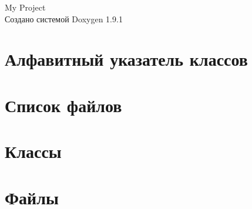 \let\mypdfximage\pdfximage\def\pdfximage{\immediate\mypdfximage}\documentclass[twoside]{book}
\newcommand{\+}{\discretionary{\mbox{\scriptsize$\hookleftarrow$}}{}{}}
\newcommand{\clearemptydoublepage}{%
  \newpage{\pagestyle{empty}\cleardoublepage}%
}
\begin{document}
\raggedbottom

\hypersetup{pageanchor=false,
             bookmarksnumbered=true,
             pdfencoding=unicode
            }
\begin{titlepage}
\vspace*{7cm}
\begin{center}%
{\Large My Project }\\
\vspace*{1cm}
{\large Создано системой Doxygen 1.9.1}\\
\end{center}
\end{titlepage}
\clearemptydoublepage
{}
\tableofcontents
\clearemptydoublepage
{}
\hypersetup{pageanchor=true}

\chapter{Алфавитный указатель классов}

\chapter{Список файлов}

\chapter{Классы}






\chapter{Файлы}



\backmatter
\newpage
{}
\clearemptydoublepage
{}
\printindex
\end{document}
